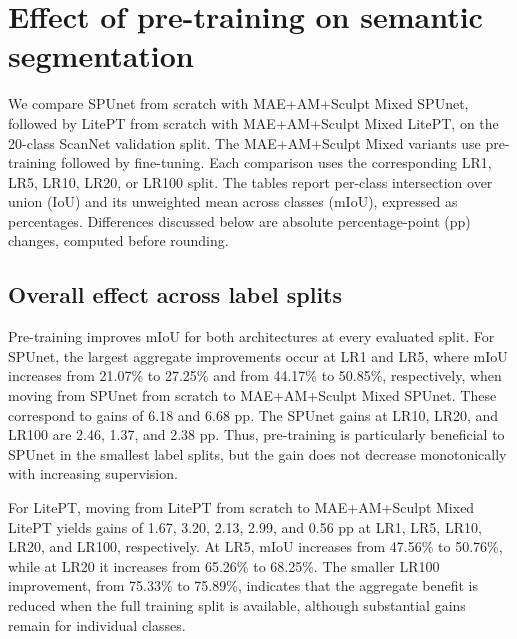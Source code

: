 \providecommand{\classwiseTableDir}{tools/classwise_tables}

\section{Effect of pre-training on semantic segmentation}
\label{sec:classwise-results}

We compare SPUnet from scratch with MAE+AM+Sculpt Mixed SPUnet, followed by LitePT from scratch with MAE+AM+Sculpt Mixed LitePT, on the 20-class ScanNet validation split. The MAE+AM+Sculpt Mixed variants use pre-training followed by fine-tuning. Each comparison uses the corresponding LR1, LR5, LR10, LR20, or LR100 split. The tables report per-class intersection over union (IoU) and its unweighted mean across classes (mIoU), expressed as percentages. Differences discussed below are absolute percentage-point (pp) changes, computed before rounding.

\subsection{Overall effect across label splits}

Pre-training improves mIoU for both architectures at every evaluated split. For SPUnet, the largest aggregate improvements occur at LR1 and LR5, where mIoU increases from 21.07\% to 27.25\% and from 44.17\% to 50.85\%, respectively, when moving from SPUnet from scratch to MAE+AM+Sculpt Mixed SPUnet. These correspond to gains of 6.18 and 6.68 pp. The SPUnet gains at LR10, LR20, and LR100 are 2.46, 1.37, and 2.38 pp. Thus, pre-training is particularly beneficial to SPUnet in the smallest label splits, but the gain does not decrease monotonically with increasing supervision.

For LitePT, moving from LitePT from scratch to MAE+AM+Sculpt Mixed LitePT yields gains of 1.67, 3.20, 2.13, 2.99, and 0.56 pp at LR1, LR5, LR10, LR20, and LR100, respectively. At LR5, mIoU increases from 47.56\% to 50.76\%, while at LR20 it increases from 65.26\% to 68.25\%. The smaller LR100 improvement, from 75.33\% to 75.89\%, indicates that the aggregate benefit is reduced when the full training split is available, although substantial gains remain for individual classes.


